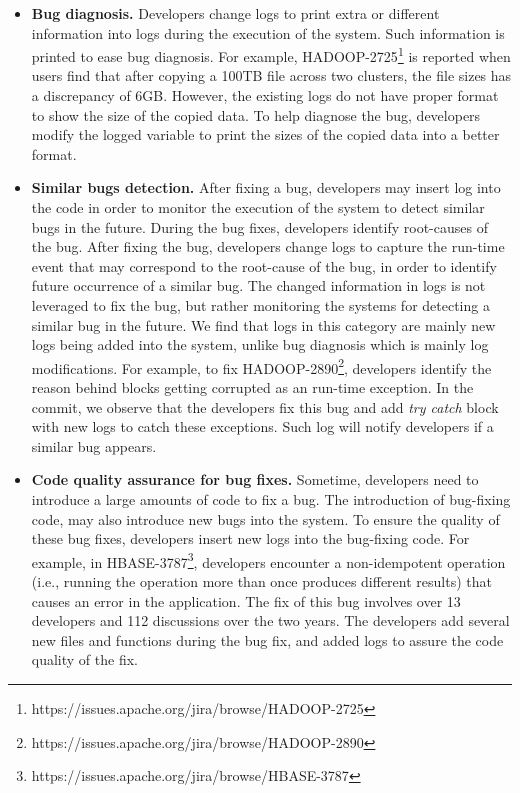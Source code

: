 \begin{itemize}
	

\item \textbf{Bug diagnosis.} Developers change logs to print extra or different information into logs during the execution of the system. Such information is printed to ease bug diagnosis.
For example, HADOOP-2725\footnote{https://issues.apache.org/jira/browse/HADOOP-2725} is reported when users find that after copying a 100TB file across two clusters, the file sizes has a discrepancy of 6GB. However, the existing logs do not have proper format to show the size of the copied data. To help diagnose the bug, developers modify the logged variable to print the sizes of the copied data into a better format. %


\item \textbf{Similar bugs detection.} After fixing a bug, developers may insert log into the code in order to monitor the execution of the system to detect similar bugs in the future. During the bug fixes, developers identify root-causes of the bug. After fixing the bug, developers change logs to capture the run-time event that may correspond to the root-cause of the bug, in order to identify future occurrence of a similar bug. The changed information in logs is not leveraged to fix the bug, but rather monitoring the systems for detecting a similar bug in the future. We find that logs in this category are mainly new logs being added into the system, unlike bug diagnosis which is mainly log modifications. 
For example, to fix HADOOP-2890\footnote{https://issues.apache.org/jira/browse/HADOOP-2890}, developers identify the reason behind blocks getting corrupted as an run-time exception. In the commit, we observe that the developers fix this bug and add \textsl{try catch} block with new logs to catch these exceptions. Such log will notify developers if a similar bug appears.

\item \textbf{Code quality assurance for bug fixes.} Sometime, developers need to introduce a large amounts of code to fix a bug. The introduction of bug-fixing code, may also introduce new bugs into the system. To ensure the quality of these bug fixes, developers insert new logs into the bug-fixing code. For example, in HBASE-3787\footnote{https://issues.apache.org/jira/browse/HBASE-3787}, developers encounter a non-idempotent operation (i.e., running the operation more than once produces different results) that causes an error in the application. The fix of this bug involves over 13 developers and 112 discussions over the two years. The developers add several new files and functions during the bug fix, and added logs to assure the code quality of the fix. 
\end{itemize}
